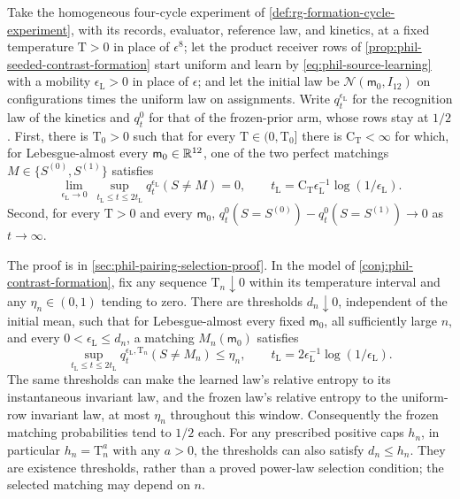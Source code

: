 Take the homogeneous four-cycle experiment of
\cref{def:rg-formation-cycle-experiment}, with its records, evaluator, reference
law, and kinetics, at a fixed temperature \(\mathrm T>0\) in place of
\(\epsilon^8\); let the product receiver rows of
\cref{prop:phil-seeded-contrast-formation} start uniform and learn by
\cref{eq:phil-source-learning} with a mobility \(\epsilon_{\mathrm L}>0\) in
place of \(\epsilon\); and let the initial law be
\(\mathcal N(\mathsf m_0,I_{12})\) on configurations times the uniform law on
assignments. Write \(q^{\epsilon_{\mathrm L}}_t\) for the recognition law of the
kinetics and \(q^0_t\) for that of the frozen-prior arm, whose rows stay at
\(1/2\). First, there is \(\mathrm T_0>0\) such
that for every \(\mathrm T\in(0,\mathrm T_0]\) there is
\(\mathrm C_{\mathrm T}<\infty\) for which, for Lebesgue-almost every
\(\mathsf m_0\in\mathbb R^{12}\), one of the two perfect matchings
\(M\in\{S^{(0)},S^{(1)}\}\) satisfies
\[
\lim_{\epsilon_{\mathrm L}\to0}\ \sup_{t_{\mathrm L}\le t\le2t_{\mathrm L}}
q^{\epsilon_{\mathrm L}}_t(S\ne M)=0,
\qquad
t_{\mathrm L}=\mathrm C_{\mathrm T}\epsilon_{\mathrm L}^{-1}\log(1/\epsilon_{\mathrm L}).
\]
Second, for every \(\mathrm T>0\) and every \(\mathsf m_0\),
\(q^0_t(S=S^{(0)})-q^0_t(S=S^{(1)})\to0\) as \(t\to\infty\).

The proof is in \cref{sec:phil-pairing-selection-proof}.
In the model of \cref{conj:phil-contrast-formation}, fix any sequence
\(\mathrm T_n\downarrow0\) within its temperature interval and any
\(\eta_n\in(0,1)\) tending to zero. There are thresholds \(d_n\downarrow0\), independent
of the initial mean, such that for Lebesgue-almost every fixed
\(\mathsf m_0\), all sufficiently large \(n\), and every
\(0<\epsilon_{\mathrm L}\le d_n\), a matching \(M_n(\mathsf m_0)\) satisfies
\[
 \sup_{t_{\mathrm L}\le t\le2t_{\mathrm L}}
 q_t^{\epsilon_{\mathrm L},\mathrm T_n}(S\ne M_n)\le\eta_n,
 \qquad t_{\mathrm L}=2\epsilon_{\mathrm L}^{-1}\log(1/\epsilon_{\mathrm L}).
\]
The same thresholds can make the learned law's relative entropy to its
instantaneous invariant law, and the frozen law's relative entropy to the
uniform-row invariant law, at most \(\eta_n\) throughout this window.
Consequently the frozen matching probabilities tend to \(1/2\) each.
For any prescribed positive caps \(h_n\), in particular
\(h_n=\mathrm T_n^a\) with any \(a>0\), the thresholds can also satisfy
\(d_n\le h_n\). They are existence thresholds, rather than a
proved power-law selection condition; the selected matching may depend on
\(n\).

